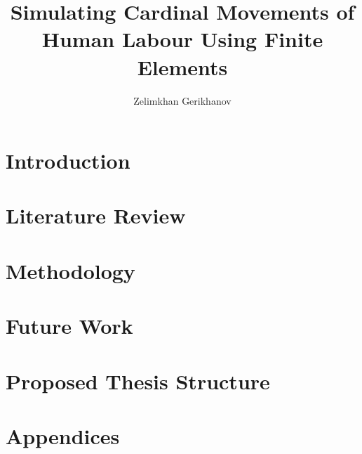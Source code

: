 \documentclass[oneside,12pt]{CUEDthesisPSnPDF}
\title{Simulating Cardinal Movements of Human Labour Using Finite Elements}
\author{Zelimkhan Gerikhanov}
\begin{document}
\maketitle

\listoffixmes
{}
\tableofcontents
\listoffigures
\listoftables



\clearpage
{}

\chapter{Introduction}\label{chap-introduction}


\chapter{Literature Review}\label{chap-literature}



\chapter{Methodology}\label{chap-methodology}






\chapter{Future Work}\label{chap-future}


\chapter{Proposed Thesis Structure}\label{chap-thesis}



%


\chapter{Appendices}


\end{document}
